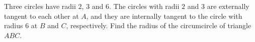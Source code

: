 Three circles have radii $2$, $3$ and $6$. The circles with radii $2$ and $3$ are externally tangent to each other at $A$, and they are internally tangent to the circle with radius $6$ at $B$ and $C$, respectively. Find the radius of the circumcircle of triangle $ABC$.
